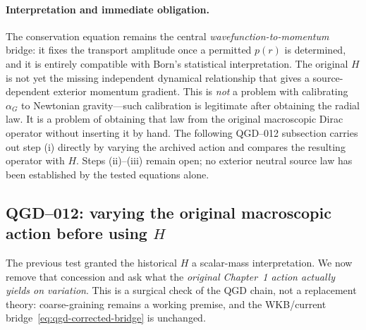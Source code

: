 \documentclass[11pt,a4paper]{article}
\begin{document}
\paragraph{Interpretation and immediate obligation.}
The conservation equation remains the central \emph{wavefunction-to-momentum} bridge: it fixes the transport amplitude once a permitted $p(r)$ is determined, and it is entirely compatible with Born's statistical interpretation.  The original $H$ is not yet the missing independent dynamical relationship that gives a source-dependent exterior momentum gradient.  This is \emph{not} a problem with calibrating $\alpha_G$ to Newtonian gravity---such calibration is legitimate after obtaining the radial law. It is a problem of obtaining that law from the original macroscopic Dirac operator without inserting it by hand.  The following QGD--012 subsection carries out step (i) directly by varying the archived action and compares the resulting operator with $H$. Steps (ii)--(iii) remain open; no exterior neutral source law has been established by the tested equations alone.


\subsection{QGD--012: varying the original macroscopic action before using \texorpdfstring{$H$}{H}}\label{sec:qgd012-variation}
The previous test granted the historical $H$ a scalar-mass interpretation. We now remove that concession and ask what the \emph{original Chapter~1 action actually yields on variation}. This is a surgical check of the QGD chain, not a replacement theory: coarse-graining remains a working premise, and the WKB/current bridge~\eqref{eq:qgd-corrected-bridge} is unchanged.
\end{document}
